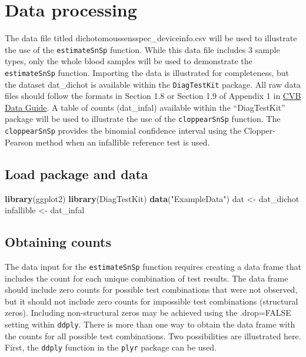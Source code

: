 \documentclass[
  12pt,
]{article}
\newenvironment{Shaded}{\begin{snugshade}}{\end{snugshade}}
\newcommand{\FunctionTok}[1]{\textcolor[rgb]{0.13,0.29,0.53}{\textbf{#1}}}
\newcommand{\NormalTok}[1]{#1}
\newcommand{\OtherTok}[1]{\textcolor[rgb]{0.56,0.35,0.01}{#1}}
\newcommand{\StringTok}[1]{\textcolor[rgb]{0.31,0.60,0.02}{#1}}
\begin{document}
\section{Data processing}\label{data-processing}

The data file titled dichotomoussensspec\_deviceinfo.csv will be used to
illustrate the use of the \texttt{estimateSnSp} function. While this
data file includes 3 sample types, only the whole blood samples will be
used to demonstrate the \texttt{estimateSnSp} function. Importing the
data is illustrated for completeness, but the dataset dat\_dichot is
available within the \texttt{DiagTestKit} package. All raw data files
should follow the formats in Section 1.8 or Section 1.9 of Appendix 1 in
\href{https://www.aphis.usda.gov/animal_health/vet_biologics/publications/16-CVBDataGuide.pdf}{CVB
Data Guide}. A table of counts (dat\_infal) available within the
``DiagTestKit'' package will be used to illustrate the use of the
\texttt{cloppearSnSp} function. The \texttt{cloppearSnSp} provides the
binomial confidence interval using the Clopper-Pearson method when an
infallible reference test is used.

\subsection{Load package and data}\label{load-package-and-data}

\begin{Shaded}
\begin{Highlighting}[]
\FunctionTok{library}\NormalTok{(ggplot2)}
\FunctionTok{library}\NormalTok{(DiagTestKit)}
\FunctionTok{data}\NormalTok{(}\StringTok{"ExampleData"}\NormalTok{)}
\NormalTok{dat }\OtherTok{\textless{}{-}}\NormalTok{ dat\_dichot}
\NormalTok{infallible }\OtherTok{\textless{}{-}}\NormalTok{ dat\_infal}
\end{Highlighting}
\end{Shaded}

\subsection{Obtaining counts}\label{obtaining-counts}

The data input for the \texttt{estimateSnSp} function requires creating
a data frame that includes the count for each unique combination of test
results. The data frame should include zero counts for possible test
combinations that were not observed, but it should not include zero
counts for impossible test combinations (structural zeros). Including
non-structural zeros may be achieved using the .drop=FALSE setting
within \texttt{ddply}. There is more than one way to obtain the data
frame with the counts for all possible test combinations. Two
possibilities are illustrated here. First, the \texttt{ddply} function
in the \texttt{plyr} package can be used.
\end{document}
